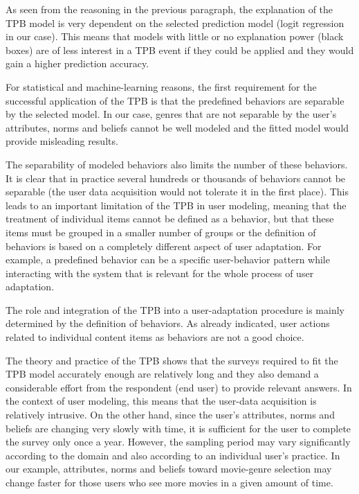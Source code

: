 \documentclass{llncs}
\begin{document}
As seen from the reasoning in the previous paragraph, the explanation of the TPB model is very dependent on the selected prediction model (logit regression in our case). This means that models with little or no explanation power (black boxes) are of less interest in a TPB event if they could be applied and they would gain a higher prediction accuracy.


\vspace{0.6em}
  For statistical and machine-learning reasons, the first requirement for the successful application of the TPB is that the predefined behaviors are separable by the selected model. In our case, genres that are not separable by the user’s attributes, norms and beliefs cannot be well modeled and the fitted model would provide misleading results.

The separability of modeled behaviors also limits the number of these behaviors. It is clear that in practice several hundreds or thousands of behaviors cannot be separable (the user data acquisition would not tolerate it in the first place). This leads to an important limitation of the TPB in user modeling, meaning that the treatment of individual items cannot be defined as a behavior, but that these items must be grouped in a smaller number of groups or the definition of behaviors is based on a completely different aspect of user adaptation. For example, a predefined behavior can be a specific user-behavior pattern while interacting with the system that is relevant for the whole process of user adaptation.

\vspace{0.6em}
 The role and integration of the TPB into a user-adaptation procedure is mainly determined by the definition of behaviors. As already indicated, user actions related to individual content items as behaviors are not a good choice.

\vspace{0.6em}
 The theory and practice of the TPB shows that the surveys required to fit the TPB model accurately enough are relatively long and they also demand a considerable effort from the respondent (end user) to provide relevant answers. In the context of user modeling, this means that the user-data acquisition is relatively intrusive. On the other hand, since the user’s attributes, norms and beliefs are changing very slowly with time, it is sufficient for the user to complete the survey only once a year. However, the sampling period may vary significantly according to the domain and also according to an individual user’s practice. In our example, attributes, norms and beliefs toward movie-genre selection may change faster for those users who see more movies in a given amount of time.
\end{document}
